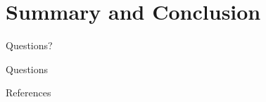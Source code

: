 \documentclass[10pt]{beamer}
\begin{document}
\section{Summary and Conclusion}

{
\begin{frame}[standout]
  Questions?
\end{frame}
}

\appendix

\begin{frame}[fragile]{Questions}
\end{frame}

\begin{frame}[allowframebreaks]{References}

  
  

\end{frame}
\end{document}
